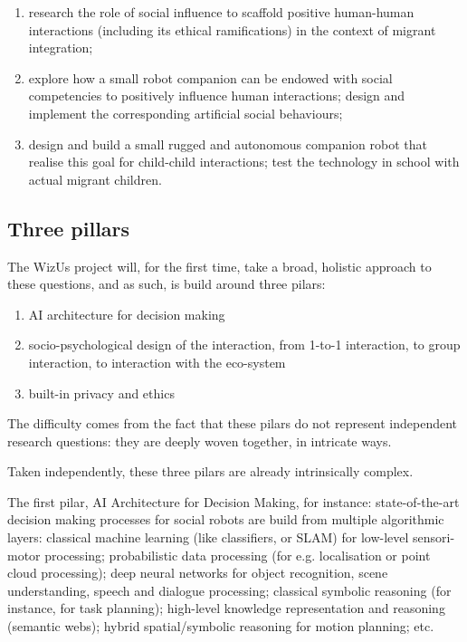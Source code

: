 \documentclass[11pt,a4paper]{report}
\newcommand{\project}{WizUs\xspace}
\begin{document}
\begin{enumerate}
\item research the role of social influence to scaffold positive human-human
    interactions (including its ethical ramifications) in the context of migrant
    integration;
\item explore how a small robot companion can be endowed with social
    competencies to positively influence human interactions; design and
    implement the corresponding artificial social behaviours;
\item design and build a small rugged and autonomous companion robot that
    realise this goal for child-child interactions; test the technology in
    school with actual migrant children.
\end{enumerate}


\subsection{Three pillars}

The \project project will, for the first time, take a broad, holistic approach
to these questions, and as such, is build around three pilars:

\begin{enumerate}
    \item AI architecture for decision making
    \item socio-psychological design of the interaction, from 1-to-1
        interaction, to group interaction, to interaction with the eco-system
    \item built-in privacy and ethics
\end{enumerate}

The difficulty comes from the fact that these pilars do not represent independent
research questions: they are deeply woven together, in intricate ways.

Taken independently, these three pilars are already intrinsically complex.

The first pilar, AI Architecture for Decision Making, for instance:
state-of-the-art decision making processes for social robots are build from
multiple algorithmic layers: classical machine learning (like classifiers, or
SLAM) for low-level sensori-motor processing; probabilistic data processing (for
e.g. localisation or point cloud processing); deep neural networks for object
recognition, scene understanding, speech and dialogue processing; classical
symbolic reasoning (for instance, for task planning); high-level knowledge
representation and reasoning (semantic webs); hybrid spatial/symbolic reasoning
for motion planning; etc.
\end{document}
